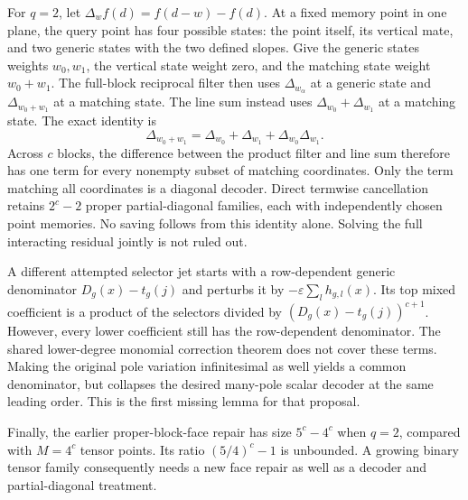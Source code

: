 \documentclass[11pt]{article}
\begin{document}
For $q=2$, let $\Delta_w f(d)=f(d-w)-f(d)$. At a fixed memory point in
one plane, the query point has four possible states: the point itself,
its vertical mate, and two generic states with the two defined slopes.
Give the generic states weights $w_0,w_1$, the vertical state weight zero,
and the matching state weight $w_0+w_1$. The full-block reciprocal filter
then uses $\Delta_{w_\alpha}$ at a generic state and
$\Delta_{w_0+w_1}$ at a matching state. The line sum instead uses
$\Delta_{w_0}+\Delta_{w_1}$ at a matching state. The exact identity is
\[
 \Delta_{w_0+w_1}
 =\Delta_{w_0}+\Delta_{w_1}+\Delta_{w_0}\Delta_{w_1}.
\]
Across $c$ blocks, the difference between the product filter and line sum
therefore has one term for every nonempty subset of matching coordinates.
Only the term matching all coordinates is a diagonal decoder. Direct
termwise cancellation retains $2^c-2$ proper partial-diagonal families,
each with independently chosen point memories. No saving follows from
this identity alone. Solving the full interacting residual jointly is
not ruled out.

A different attempted selector jet starts with a row-dependent generic
denominator $D_g(x)-t_g(j)$ and perturbs it by
$-\varepsilon\sum_l h_{g,l}(x)$. Its top mixed coefficient is a product
of the selectors divided by $(D_g(x)-t_g(j))^{c+1}$. However, every lower
coefficient still has the row-dependent denominator. The shared
lower-degree monomial correction theorem does not cover these terms.
Making the original pole variation infinitesimal as well yields a common
denominator, but collapses the desired many-pole scalar decoder at the
same leading order. This is the first missing lemma for that proposal.

Finally, the earlier proper-block-face repair has size $5^c-4^c$ when
$q=2$, compared with $M=4^c$ tensor points. Its ratio $(5/4)^c-1$ is
unbounded. A growing binary tensor family consequently needs a new face
repair as well as a decoder and partial-diagonal treatment.
\end{document}

